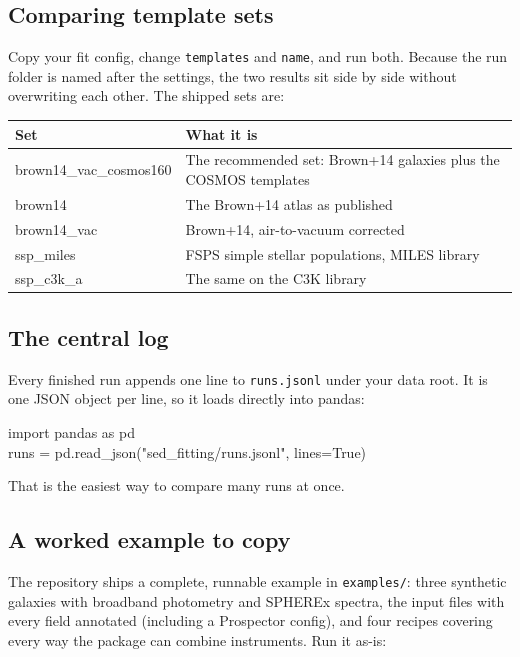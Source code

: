 \documentclass[11pt]{article}
\begin{document}
\subsection{Comparing template sets}

Copy your fit config, change \texttt{templates} and \texttt{name}, and run
both. Because the run folder is named after the settings, the two results
sit side by side without overwriting each other. The shipped sets are:

\begin{center}
\begin{tabular}{>{\ttfamily}l p{8.2cm}}
\toprule
\textbf{\normalfont Set} & \textbf{What it is} \\
\midrule
brown14\_vac\_cosmos160 & The recommended set: Brown+14 galaxies plus the
  COSMOS templates \\
brown14 & The Brown+14 atlas as published \\
brown14\_vac & Brown+14, air-to-vacuum corrected \\
ssp\_miles & FSPS simple stellar populations, MILES library \\
ssp\_c3k\_a & The same on the C3K library \\
\bottomrule
\end{tabular}
\end{center}

\subsection{The central log}

Every finished run appends one line to \texttt{runs.jsonl} under your data
root. It is one JSON object per line, so it loads directly into pandas:

\begin{cmd}\ttfamily
import pandas as pd\\
runs = pd.read\_json("sed\_fitting/runs.jsonl", lines=True)
\end{cmd}

That is the easiest way to compare many runs at once.

\subsection{A worked example to copy}

The repository ships a complete, runnable example in \texttt{examples/}:
three synthetic galaxies with broadband photometry and SPHEREx spectra,
the input files with every field annotated (including a Prospector
config), and four recipes covering every way the package can combine
instruments. Run it as-is:
\end{document}
